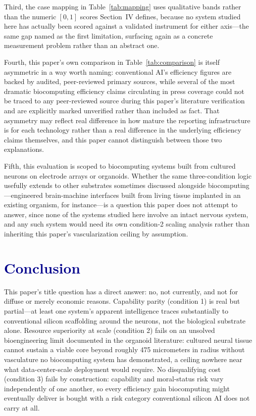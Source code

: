 \documentclass[journal]{IEEEtran}
\begin{document}
Third, the case mapping in Table~\ref{tab:mapping} uses qualitative bands rather
than the numeric $[0,1]$ scores Section~IV defines, because no system studied here
has actually been scored against a validated instrument for either axis---the same
gap named as the first limitation, surfacing again as a concrete measurement
problem rather than an abstract one.

Fourth, this paper's own comparison in Table~\ref{tab:comparison} is itself
asymmetric in a way worth naming: conventional AI's efficiency figures are backed by
audited, peer-reviewed primary sources, while several of the most dramatic
biocomputing efficiency claims circulating in press coverage could not be traced to
any peer-reviewed source during this paper's literature verification and are
explicitly marked unverified rather than included as fact. That asymmetry may
reflect real difference in how mature the reporting infrastructure is for each
technology rather than a real difference in the underlying efficiency claims
themselves, and this paper cannot distinguish between those two explanations.

Fifth, this evaluation is scoped to biocomputing systems built from cultured
neurons on electrode arrays or organoids. Whether the same three-condition logic
usefully extends to other substrates sometimes discussed alongside
biocomputing---engineered brain-machine interfaces built from living tissue
implanted in an existing organism, for instance---is a question this paper does not
attempt to answer, since none of the systems studied here involve an intact nervous
system, and any such system would need its own condition-2 scaling analysis rather
than inheriting this paper's vascularization ceiling by assumption.

\section{\textcolor{darkblue}{Conclusion}}

This paper's title question has a direct answer: no, not currently, and not for
diffuse or merely economic reasons. Capability parity (condition 1) is real but
partial---at least one system's apparent intelligence traces substantially to
conventional silicon scaffolding around the neurons, not the biological substrate
alone. Resource superiority at scale (condition 2) fails on an unsolved
bioengineering limit documented in the organoid literature: cultured neural tissue
cannot sustain a viable core beyond roughly 475 micrometers in radius without
vasculature no biocomputing system has demonstrated, a ceiling nowhere near what
data-center-scale deployment would require. No disqualifying cost (condition 3) fails by construction: capability and
moral-status risk vary independently of one another, so every efficiency gain
biocomputing might eventually deliver is bought with a risk category conventional
silicon AI does not carry at all.
\end{document}
